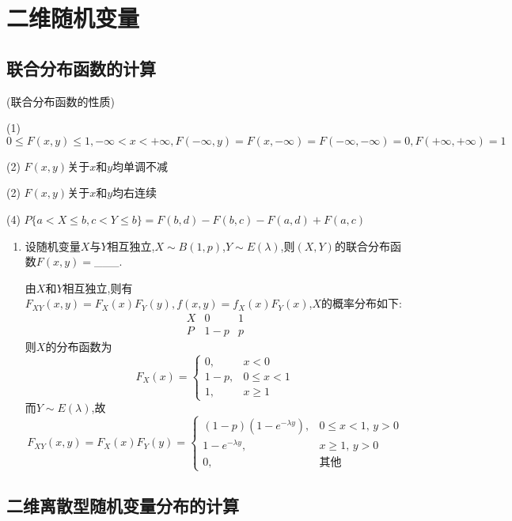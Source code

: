 \documentclass[12pt, a4paper, oneside, UTF8]{ctexbook}
\begin{document}
% 
\else
\fi
\chapter{二维随机变量}

\section{联合分布函数的计算}
\begin{remark}
    (联合分布函数的性质)
    \item[(1)] $0\leq F(x,y)\leq 1,-\infty<x<+\infty, F(-\infty,y)=F(x,-\infty)=F(-\infty,-\infty)=0,F(+\infty,+\infty)=1$
    \item[(2)] $F(x,y)$关于$x$和$y$均单调不减
    \item[(2)] $F(x,y)$关于$x$和$y$均右连续
    \item[(4)] $P\{a<X\leq b,c<Y\leq b\}=F(b,d)-F(b,c)-F(a,d)+F(a,c)$  
\end{remark}

\begin{enumerate}[label=\arabic*.]
    \item 设随机变量$X$与$Y$相互独立,$X\sim B(1,p)$,$Y\sim E(\lambda)$,则$(X,Y)$的联合分布函数$F(x,y)=$\_\_\_.
    
    \begin{solution}
    由$X$和$Y$相互独立,则有$F_{XY}(x,y)=F_{X}(x)F_{Y}(y),f(x,y)=f_{X}(x)F_{Y}(x)$,$X$的概率分布如下:
    \[
    \begin{array}{c|c|c}
        X&0&1\\
        P&1-p&p
    \end{array}
    \]
    则$X$的分布函数为
    \[F_{X}(x)=
    \begin{cases}
        0, & x < 0\\
        1-p, & 0\leq x < 1\\
        1, &x\geq 1
    \end{cases}
    \]
    而$Y\sim E(\lambda)$,故
    \[
    F_{XY}(x,y)=F_{X}(x)F_{Y}(y)=\begin{cases}
        (1-p)(1-e^{-\lambda y}), & 0\leq x < 1,\, y > 0 \\
        1-e^{-\lambda y}, & x\geq 1,\, y > 0\\
        0, & \text{其他}
    \end{cases}
    \]
    \end{solution}
\end{enumerate}

\section{二维离散型随机变量分布的计算}
\end{document}
